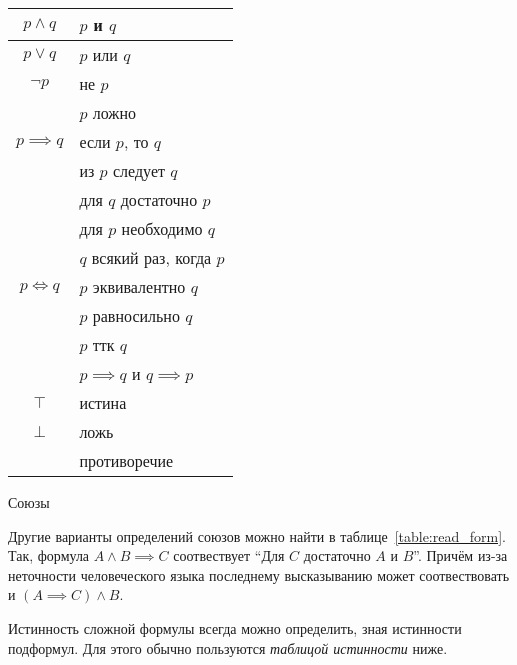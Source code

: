 \begin{margintable}[7cm]
  \begin{tabular}{cl}
    $p\land q$    & $p$ и $q$                                   \\\hline
    $p\lor q$     & $p$ или $q$                                 \\\hline
    $\lnot p$     & не $p$                                      \\
                  & $p$ ложно                                   \\ \hline
    $p\implies q$ & если $p$, то $q$                            \\
                  & из $p$ следует $q$                          \\
                  & для $q$ достаточно\index{достаточность} $p$ \\
                  & для $p$ необходимо\index{необходимость} $q$ \\
                  & $q$ всякий раз, когда $p$                   \\\hline
    $p\iff q$     & $p$ эквивалентно $q$                        \\
                  & $p$ равносильно $q$                         \\
                  & $p$ ттк $q$                                 \\
                  & $p\implies q$ и $q\implies p$               \\\hline
    $\top$        & истина                                      \\\hline
    $\bot$        & ложь                                        \\
                  & противоречие
  \end{tabular}

  \caption{Союзы}\label{table:read_form}
\end{margintable}

Другие варианты определений союзов можно
найти в таблице~\ref{table:read_form}.
Так, формула ${A\land B\implies C}$
соотвествует ``Для $C$ достаточно $A$ и $B$''.
Причём из-за неточности человеческого языка последнему
высказыванию может соотвествовать и
${(A\implies C)\land B}$.

Истинность сложной формулы всегда можно определить, зная истинности
подформул. Для этого обычно пользуются {\it таблицой истинности} ниже.

